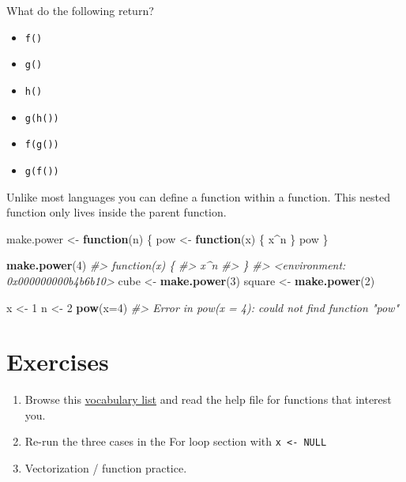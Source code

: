 \documentclass[]{book}
\newenvironment{Shaded}{\begin{snugshade}}{\end{snugshade}}
\newcommand{\KeywordTok}[1]{\textcolor[rgb]{0.13,0.29,0.53}{\textbf{#1}}}
\newcommand{\DataTypeTok}[1]{\textcolor[rgb]{0.13,0.29,0.53}{#1}}
\newcommand{\DecValTok}[1]{\textcolor[rgb]{0.00,0.00,0.81}{#1}}
\newcommand{\StringTok}[1]{\textcolor[rgb]{0.31,0.60,0.02}{#1}}
\newcommand{\CommentTok}[1]{\textcolor[rgb]{0.56,0.35,0.01}{\textit{#1}}}
\newcommand{\ControlFlowTok}[1]{\textcolor[rgb]{0.13,0.29,0.53}{\textbf{#1}}}
\newcommand{\OperatorTok}[1]{\textcolor[rgb]{0.81,0.36,0.00}{\textbf{#1}}}
\newcommand{\NormalTok}[1]{#1}
\providecommand{\tightlist}{%
  \setlength{\itemsep}{0pt}\setlength{\parskip}{0pt}}
\theoremstyle{definition}
\theoremstyle{definition}
\theoremstyle{definition}
\theoremstyle{remark}
\begin{document}
What do the following return?

\begin{itemize}
\tightlist
\item
  \texttt{f()}
\item
  \texttt{g()}
\item
  \texttt{h()}
\item
  \texttt{g(h())}
\item
  \texttt{f(g())}
\item
  \texttt{g(f())}
\end{itemize}

Unlike most languages you can define a function within a function. This
nested function only lives inside the parent function.

\begin{Shaded}
\begin{Highlighting}[]
\NormalTok{make.power <-}\StringTok{ }\ControlFlowTok{function}\NormalTok{(n) \{}
\NormalTok{  pow <-}\StringTok{ }\ControlFlowTok{function}\NormalTok{(x) \{}
\NormalTok{    x}\OperatorTok{^}\NormalTok{n }
\NormalTok{  \}}
\NormalTok{  pow}
\NormalTok{\}}

\KeywordTok{make.power}\NormalTok{(}\DecValTok{4}\NormalTok{)}
\CommentTok{#> function(x) \{}
\CommentTok{#>     x^n }
\CommentTok{#>   \}}
\CommentTok{#> <environment: 0x000000000b4b6b10>}
\NormalTok{cube <-}\StringTok{ }\KeywordTok{make.power}\NormalTok{(}\DecValTok{3}\NormalTok{)}
\NormalTok{square <-}\StringTok{ }\KeywordTok{make.power}\NormalTok{(}\DecValTok{2}\NormalTok{)}

\NormalTok{x <-}\StringTok{ }\DecValTok{1}
\NormalTok{n <-}\StringTok{ }\DecValTok{2}
\KeywordTok{pow}\NormalTok{(}\DataTypeTok{x=}\DecValTok{4}\NormalTok{)}
\CommentTok{#> Error in pow(x = 4): could not find function "pow"}
\end{Highlighting}
\end{Shaded}

\section{Exercises}\label{exercises-1}

\begin{enumerate}
\def\labelenumi{\arabic{enumi}.}
\tightlist
\item
  Browse this \href{http://adv-r.had.co.nz/Vocabulary.html}{vocabulary
  list} and read the help file for functions that interest you.
\item
  Re-run the three cases in the For loop section with
  \texttt{x\ \textless{}-\ NULL}
\item
  Vectorization / function practice.
\end{enumerate}
\end{document}
